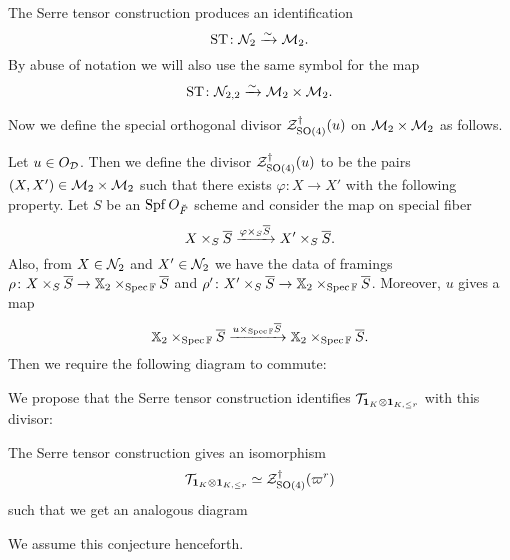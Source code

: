\begin{proposition}
  The Serre tensor construction produces an identification
  \[ \operatorname{ST} \colon \mathcal N_2 \xrightarrow{\sim} \mathcal M_2. \]
  By abuse of notation we will also use the same symbol for the map
  \[ \operatorname{ST} \colon \mathcal N_{2,2} \xrightarrow{\sim} \mathcal M_2 \times \mathcal M_2. \]
\end{proposition}

Now we define the special orthogonal divisor $\mathcal Z^{\dagger}_{\operatorname{SO}(4)}(u)$
on $\mathcal M_2 \times \mathcal M_2$ as follows.
\begin{definition}
  Let $u \in O_\mathcal D$.
  Then we define the divisor $\mathcal Z^{\dagger}_{\operatorname{SO}(4)}(u)$ to be the pairs $(X, X') \in \mathcal M_2 \times \mathcal M_2$
  such that there exists $\varphi \colon X \to X'$ with the following property.
  Let $S$ be an $\operatorname{Spf} O_{\breve F}$ scheme and consider the map on special fiber
  \[ X \times_S \overline S \xrightarrow{\varphi \times_S \overline S} X' \times_S \overline S. \]
  Also, from $X \in \mathcal N_2$ and $X' \in \mathcal N_2$ we have the data of framings
  $\rho \colon X \times_S \overline S \to \mathbb X_2 \times_{\operatorname{Spec} \mathbb F} \overline S$
  and $\rho' \colon X' \times_S \overline S \to \mathbb X_2 \times_{\operatorname{Spec} \mathbb F} \overline S$.
  Moreover, $u$ gives a map
  \[
    \mathbb X_2 \times_{\operatorname{Spec} \mathbb F} \overline S
    \xrightarrow{u \times _{\operatorname{Spec} \mathbb F} \overline S}
    \mathbb X_2 \times_{\operatorname{Spec} \mathbb F} \overline S.
  \]
  Then we require the following diagram to commute:
  \begin{center}
  \end{center}
\end{definition}
We propose that the Serre tensor construction identifies $\mathcal{T}_{\mathbf{1}_K \otimes \mathbf{1}_{K, \le r}}$ with this divisor:
\begin{conjecture}
  \label{conj:serre_pullback_space}
  The Serre tensor construction gives an isomorphism
  \[ \mathcal{T}_{\mathbf{1}_K \otimes \mathbf{1}_{K, \le r}} \simeq \mathcal Z^{\dagger}_{\operatorname{SO}(4)}(\varpi^r) \]
  such that we get an analogous diagram
  \begin{center}
  \end{center}
\end{conjecture}
We assume this conjecture henceforth.


